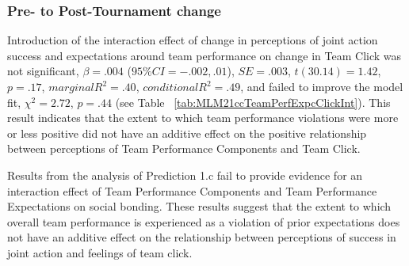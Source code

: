 \begin{CJK}{UTF8}{gbsn}
  \subsubsection{Pre- to Post-Tournament change}
  Introduction of the interaction effect of change in perceptions of joint action success and expectations around team performance on change in Team Click was not significant, $\beta = .004$ ($95\% CI =  -.002, .01$), $SE = .003$, $t(30.14) = 1.42$, $p = .17$, $marginal R^2 = .40$, $conditional R^2 = .49$, and failed to improve the model fit, $\chi^2 = 2.72$, $ p = .44$ (see Table ~\ref{tab:MLM21ccTeamPerfExpcClickInt}).  This result indicates that the extent to which team performance violations were more or less positive did not have an additive effect on the positive relationship between perceptions of Team Performance Components and Team Click.

  


Results from the analysis of Prediction 1.c fail to provide evidence for an interaction effect of Team Performance Components and Team Performance Expectations on social bonding.  These results suggest that the extent to which overall team performance is experienced as a violation of prior expectations does not have an additive effect on the relationship between perceptions of success in joint action and feelings of team click.


















\end{CJK}
